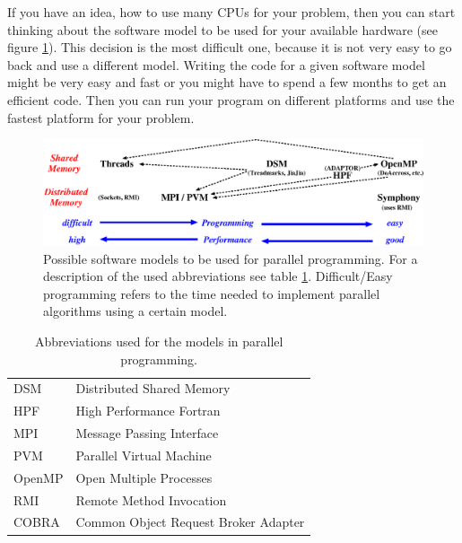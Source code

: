 If you have an idea, how to use many CPUs for your problem, then you can
start thinking about the software model to be used for your available hardware
(see figure \ref{fig:ParallelSoftware}).
This decision is the most difficult one, because it is not very easy
to go back and use a different model. Writing the code 
for a given software model might be very easy and fast or you might have to
spend a few months to get an efficient code. Then you can run your program
on different platforms and use the fastest platform for your problem.

\begin{figure}[htbp]
  \begin{center}
    \leavevmode
    \includegraphics[width=\textwidth]{Figures/ParallelSoftware.eps}
    \caption{Possible software models to be used for parallel programming. 
      For a description of the used abbreviations see table \ref{tab:ParallelAbbrev}.
      Difficult/Easy programming refers to the time needed to implement
      parallel algorithms using a certain model.}
    \label{fig:ParallelSoftware}
  \end{center}
\end{figure}
\begin{table}[htbp]
  \begin{center}
    \begin{tabular}{ll}
      DSM & Distributed Shared Memory \\
      HPF & High Performance Fortran \\
      MPI & Message Passing Interface \\
      PVM & Parallel Virtual Machine \\
      OpenMP & Open Multiple Processes \\
      RMI & Remote Method Invocation \\
      COBRA & Common Object Request Broker Adapter \\
    \end{tabular}
    \caption{Abbreviations used for the models in parallel programming.}
    \label{tab:ParallelAbbrev}
  \end{center}
\end{table}

